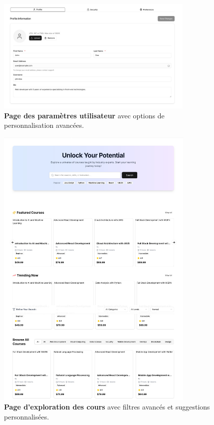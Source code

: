 \begin{figure}[H]
  \centering
  \includegraphics[width=0.85\textwidth,keepaspectratio]{old-reports/week_4_img/settings.jpeg}
  \caption{\textbf{Page des paramètres utilisateur} avec options de personnalisation avancées.}
  \label{fig:user_settings}
\end{figure}

\begin{figure}[H]
  \centering
  \includegraphics[width=0.85\textwidth,keepaspectratio]{old-reports/week_4_img/explor.jpeg}
  \caption{\textbf{Page d'exploration des cours} avec filtres avancés et suggestions personnalisées.}
  \label{fig:course_explorer}
\end{figure}

